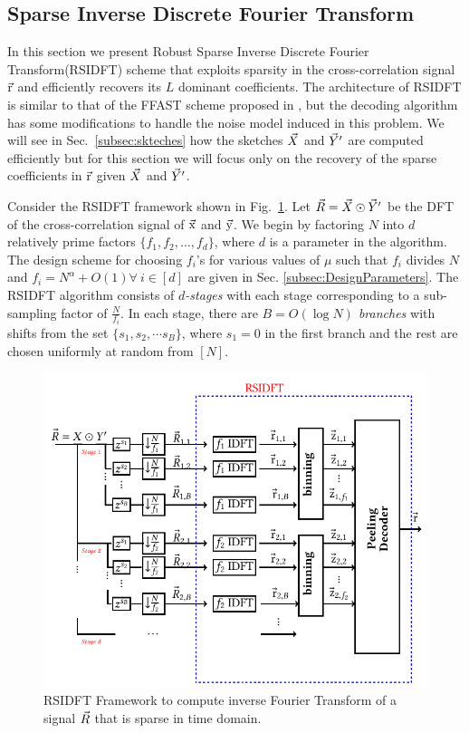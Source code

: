 \subsection{Sparse Inverse Discrete Fourier Transform}
\label{subsec:RSIDFT}	
 In this section we present Robust Sparse Inverse Discrete Fourier Transform(RSIDFT) scheme that exploits sparsity in the cross-correlation signal $\vec{\mathrm{r}}$ and efficiently recovers its $L$ dominant coefficients. The architecture of RSIDFT is similar to that of the FFAST scheme proposed in \cite{pawar2014robust}, but the decoding algorithm has some modifications to handle the noise model induced in this problem. We will see in Sec.~\ref{subsec:skteches} how the sketches $\vec{X}$ and $\vec{Y}'$ are computed efficiently but for this section we will focus only on the recovery of the sparse coefficients in $\vec{\mathrm{r}}$ given $\vec{X}$ and $\vec{Y}'$.
	  	
Consider the RSIDFT framework shown in Fig.~\ref{fig:rsidft}. Let $ \vec{R} =\vec{X} \odot \vec{Y}'$ be the DFT of the cross-correlation signal of $\vec{\mathrm{x}}$ and $\vec{\mathrm{y}}$. We begin by factoring $N$ into $d$ relatively prime factors $\{f_1,f_2,\ldots,f_d\}$, where $d$ is a parameter in the algorithm. The design scheme for choosing $f_i$'s for various values of $\mu$ such that $f_i$ divides $N$ and $f_i=N^{\alpha}+O(1) \forall ~i\in[d]$ are given in Sec. \ref{subsec:DesignParameters}. The RSIDFT algorithm consists of {\it $d$-stages} with each stage corresponding to a sub-sampling factor of $\frac{N}{f_i}$. In each stage, there are {\it $B= O(\log N)$ branches} with shifts from the set $ \{s_1, s_2, \cdots s_B\} $, where $s_1 =0$ in the first branch and the rest are chosen uniformly at random from $[N]$.
	   	 	
\begin{figure}[h!]
	\begin{center}
	 	\includegraphics[scale=0.9]{FFAST_robust1}
	\end{center}	
\caption{ RSIDFT Framework to compute inverse Fourier Transform of a signal $\vec{R}$ that is sparse in time domain. }\label{fig:rsidft}
\end{figure}

